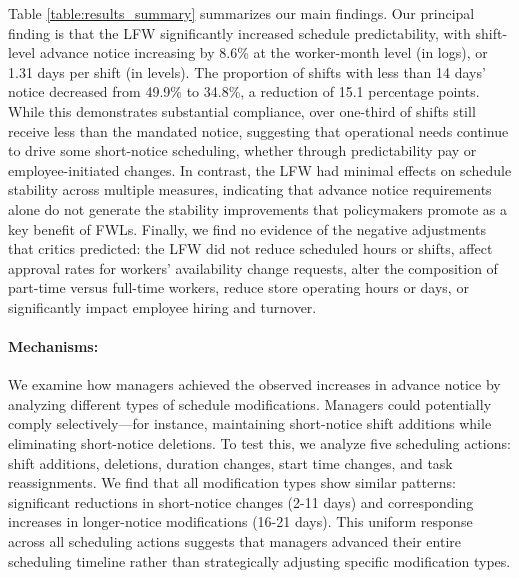\documentclass[letterpaper,11pt,leqno]{article}
\theoremstyle{paper}
\begin{document}
Table \ref{table:results_summary} summarizes our main findings. Our principal finding is that the LFW significantly increased schedule predictability, with shift-level advance notice increasing by 8.6\% at the worker-month level (in logs), or 1.31 days per shift (in levels). The proportion of shifts with less than 14 days' notice decreased from 49.9\% to 34.8\%, a reduction of 15.1 percentage points. While this demonstrates substantial compliance, over one-third of shifts still receive less than the mandated notice, suggesting that operational needs continue to drive some short-notice scheduling, whether through predictability pay or employee-initiated changes. In contrast, the LFW had minimal effects on schedule stability across multiple measures, indicating that advance notice requirements alone do not generate the stability improvements that policymakers promote as a key benefit of FWLs. Finally, we find no evidence of the negative adjustments that critics predicted: the LFW did not reduce scheduled hours or shifts, affect approval rates for workers' availability change requests, alter the composition of part-time versus full-time workers, reduce store operating hours or days, or significantly impact employee hiring and turnover. 


\paragraph{Mechanisms:}
We examine how managers achieved the observed increases in advance notice by analyzing different types of schedule modifications. Managers could potentially comply selectively—for instance, maintaining short-notice shift additions while eliminating short-notice deletions. To test this, we analyze five scheduling actions: shift additions, deletions, duration changes, start time changes, and task reassignments. We find that all modification types show similar patterns: significant reductions in short-notice changes (2-11 days) and corresponding increases in longer-notice modifications (16-21 days). This uniform response across all scheduling actions suggests that managers advanced their entire scheduling timeline rather than strategically adjusting specific modification types.
\end{document}
